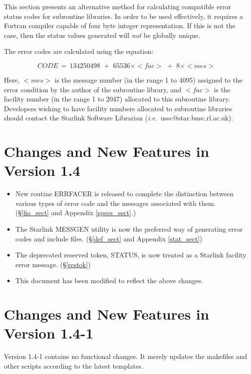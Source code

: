 \documentclass[twoside,11pt]{article}
\newcommand{\xlabel}[1]{}
\renewcommand{\_}{\texttt{\symbol{95}}}
\begin{document}
This section presents an alternative method for calculating compatible
error status codes for subroutine libraries.
In order to be used effectively, it requires a Fortran compiler capable of four
byte integer representation.
If this is not the case, then the status values generated will \emph{not} be
globally unique.

The error codes are calculated using the equation:

\begin {equation}
CODE \,= \, 134250498 \,\, + \,\, 65536\times <fac> \,\, + \,\,  8\times <mes>
\end {equation}

Here, $<mes>$ is the message number (in the range 1 to 4095) assigned to the
error condition by the author of the subroutine library, and $<fac>$ is the
facility number (in the range 1 to 2047) allocated to this subroutine library.
Developers wishing to have facility numbers allocated to subroutine libraries
should contact the Starlink Software Librarian
(\textit{i.e.}\ ussc@star.bnsc.rl.ac.uk).

\section{\xlabel{changes_and_new_features_in_version_1_4}Changes and New Features in Version 1.4}
\begin{itemize}
\item New routine ERR\_FACER is released to complete the distinction between
various types of error code and the messages associated with them.
(\S\ref{fio_sect} and Appendix \ref{specs_sect}.)
\item The Starlink MESSGEN utility is now the preferred way of generating
error codes and include files. (\S\ref{def_sect} and Appendix \ref{stat_sect})
\item The deprecated reserved token, STATUS, is now treated as a Starlink
facility error message. (\S\ref{restok})
\item This document has been modified to reflect the above changes.
\end{itemize}

\section{\xlabel{changes_and_new_features_in_version_1_41}Changes and New Features in Version 1.4-1}
Version 1.4-1 contains no functional changes. It merely updates the makefiles
and other scripts according to the latest templates.
\end{document}
